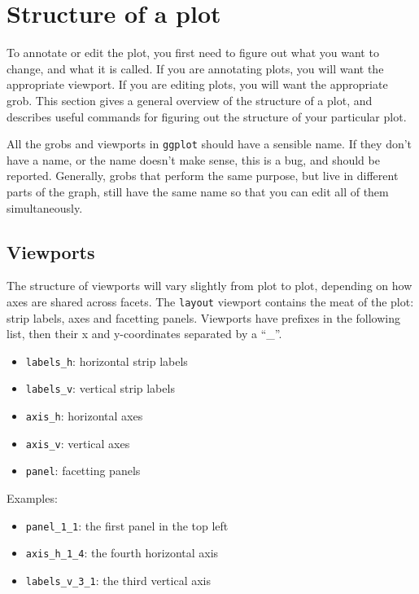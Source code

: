 \section{Structure of a plot}\label{sec:structure_of_a_plot}

To annotate or edit the plot, you first need to figure out what you want to change, and what it is called.  If you are annotating plots, you will want the appropriate viewport.  If you are editing plots, you will want the appropriate grob.  This section gives a general overview of the structure of a plot, and describes useful commands for figuring out the structure of your particular plot.

All the grobs and viewports in {\tt ggplot} should have a sensible name.  If they don't have a name, or the name doesn't make sense, this is a bug, and should be reported.  Generally, grobs that perform the same purpose, but live in different parts of the graph, still have the same name so that you can edit all of them simultaneously.  

\subsection{Viewports}\label{sub:viewports}

The structure of viewports will vary slightly from plot to plot, depending on how axes are shared across facets.  The {\tt layout} viewport contains the meat of the plot: strip labels, axes and facetting panels.  Viewports have prefixes in the following list, then their x and y-coordinates separated by a ``\_''.

\begin{itemize}
  \item {\tt labels\_h}: horizontal strip labels
  \item {\tt labels\_v}: vertical strip labels
  \item {\tt axis\_h}: horizontal axes
  \item {\tt axis\_v}: vertical axes
  \item {\tt panel}: facetting panels
\end{itemize}

Examples:

\begin{itemize}
  \item {\tt panel\_1\_1}: the first panel in the top left
  \item {\tt axis\_h\_1\_4}: the fourth horizontal axis
  \item {\tt labels\_v\_3\_1}: the third vertical axis
\end{itemize}

